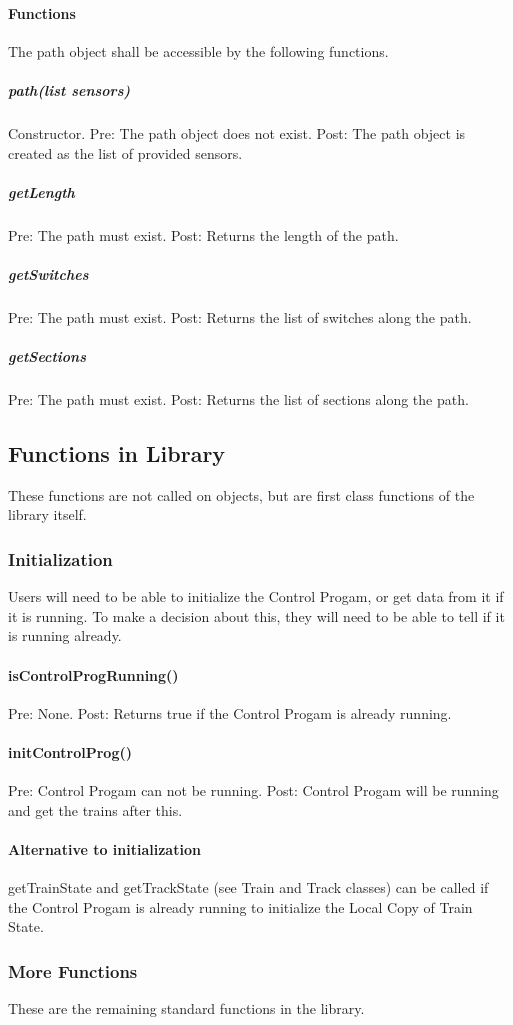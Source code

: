 \documentclass[a4paper,11pt,notitlepage]{article}
\def\CS{Control Progam\xspace}
\def\LC{Local Copy of Train State\xspace}
\begin{document}
\paragraph{Functions}
The path object shall be accessible by the following functions.
\subparagraph{path(list sensors)} Constructor. Pre: The path object does not exist. Post: The path object is created as the list of provided sensors.
\subparagraph{getLength} Pre: The path must exist. Post: Returns the length of the path.
\subparagraph{getSwitches} Pre: The path must exist.  Post: Returns the list of switches along the path.
\subparagraph{getSections} Pre: The path must exist.  Post: Returns the list of sections along the path.


\subsection{Functions in Library}
These functions are not called on objects, but are first class functions of the library itself.

\subsubsection{Initialization}
Users will need to be able to initialize the \CS, or get data from it if it is running. To make a decision about this, they will need to be able to tell if it is running already.
\paragraph{isControlProgRunning()} Pre: None. Post: Returns true if the \CS is already running.
\paragraph{initControlProg()} Pre: \CS can not be running. Post: \CS will be running and get the trains after this. %
\paragraph{Alternative to initialization} getTrainState and getTrackState (see Train and Track classes) can be called if the \CS is already running to initialize the \LC.
\subsubsection{More Functions}
These are the remaining standard functions in the library.
\end{document}
